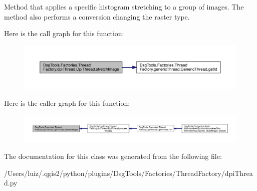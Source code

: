 \begin{DoxyVerb}Method that applies a specific histogram stretching to a group of images.
The method also performs a conversion changing the raster type.
\end{DoxyVerb}
 Here is the call graph for this function\+:
\nopagebreak
\begin{figure}[H]
\begin{center}
\leavevmode
\includegraphics[width=350pt]{class_dsg_tools_1_1_factories_1_1_thread_factory_1_1dpi_thread_1_1_dpi_thread_af78db3a3576b633a013f78a08e6fc93e_cgraph}
\end{center}
\end{figure}
Here is the caller graph for this function\+:
\nopagebreak
\begin{figure}[H]
\begin{center}
\leavevmode
\includegraphics[width=350pt]{class_dsg_tools_1_1_factories_1_1_thread_factory_1_1dpi_thread_1_1_dpi_thread_af78db3a3576b633a013f78a08e6fc93e_icgraph}
\end{center}
\end{figure}


The documentation for this class was generated from the following file\+:\begin{DoxyCompactItemize}
\item 
/\+Users/luiz/.\+qgis2/python/plugins/\+Dsg\+Tools/\+Factories/\+Thread\+Factory/dpi\+Thread.\+py\end{DoxyCompactItemize}
